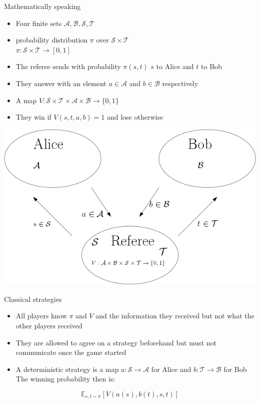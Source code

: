 \begin{frame}{Mathematically speaking}
\begin{itemize}
    \item Four finite sets $\mathcal{A}, \mathcal{B}, \mathcal{S}, \mathcal{T}$ \pause
    \item probability distribution $\pi$ over $\mathcal{S} \times \mathcal{T}$ \\ $\pi : \mathcal{S} \times \mathcal{T} \rightarrow [0,1]$ \pause
    \item The referee sends with probability $\pi (s,t)$ $s$ to Alice and $t$ to Bob \pause
    \item They answer with an element $a \in \mathcal{A}$ and $b \in \mathcal{B}$ respectively \pause
    \item A map $V : \mathcal{S} \times \mathcal{T} \times \mathcal{A} \times \mathcal{B} \rightarrow \{ 0, 1 \}$ \pause
    \item They win if $V(s,t,a,b)=1$ and lose otherwise
\end{itemize}
\begin{center}

\includegraphics[scale=0.3]{Untitled.png}

\end{center}
\end{frame}


\begin{frame}{Classical strategies}
    \begin{itemize}
        \item All players know $\pi$ and $V$ and the information they received but not what the other players received \pause
        \item They are allowed to agree on a strategy beforehand but must not communicate once the game started \pause
        \item A deterministic strategy is a map $a : \mathcal{S} \rightarrow \mathcal{A}$ for Alice and $b : \mathcal{T} \rightarrow \mathcal{B}$ for Bob
        The winning probability then is:
    \end{itemize}
    \begin{equation*}
        \mathbb{E}_{s,t \sim \pi} \left[ V(a(s),b(t),s,t) \right]
\end{equation*}
\end{frame}

